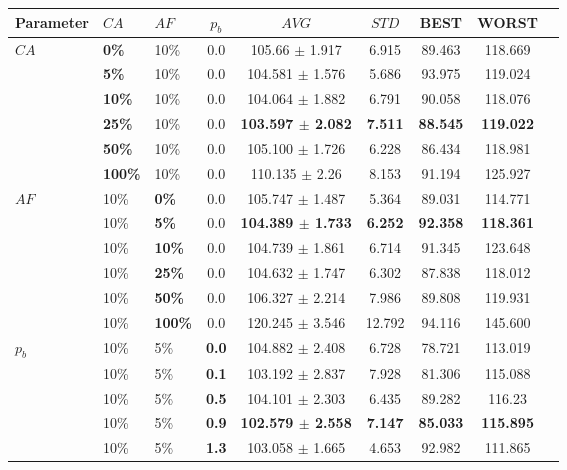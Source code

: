 \begin{table}
    \centering
    \begin{tabular}{|l|l|l|c||c|c|c|c|c|}
    \hline
    Parameter & $CA$ & $AF$ & $p_b$ & $AVG$ & $STD$ &BEST & WORST \\
    \hline
    $CA$ & \textbf{0\%} & 10\% & 0.0 & 105.66 $\pm$ 1.917 & 6.915 & 89.463 & 118.669\\
    ~ & \textbf{5\%} & 10\% & 0.0 & 104.581 $\pm$ 1.576 & 5.686 & 93.975 & 119.024\\
    ~ & \textbf{10\%} & 10\% & 0.0 & 104.064 $\pm$ 1.882 & 6.791 & 90.058 & 118.076\\
    ~ & \textbf{25\%} & 10\% & 0.0 & \textbf{103.597 $\pm$ 2.082} & \textbf{7.511} & \textbf{88.545} & \textbf{119.022}\\
    ~ & \textbf{50\%} & 10\% & 0.0 & 105.100 $\pm$ 1.726 & 6.228 & 86.434 & 118.981\\
    ~ & \textbf{100\%} & 10\% & 0.0 & 110.135 $\pm$ 2.26 & 8.153 & 91.194 & 125.927\\
    \hline
    $AF$ & 10\% & \textbf{0\%} & 0.0 & 105.747 $\pm$ 1.487 & 5.364& 89.031 & 114.771\\
    ~ & 10\% & \textbf{5\%} & 0.0 & \textbf{104.389 $\pm$ 1.733} & \textbf{6.252}& \textbf{92.358} & \textbf{118.361}\\
    ~ & 10\% & \textbf{10\%} & 0.0 & 104.739 $\pm$ 1.861 & 6.714 & 91.345 & 123.648\\
    ~ & 10\% & \textbf{25\%} & 0.0 & 104.632 $\pm$ 1.747 & 6.302 & 87.838 & 118.012\\
    ~ & 10\% & \textbf{50\%} & 0.0 & 106.327 $\pm$ 2.214 & 7.986 & 89.808 & 119.931\\
    ~ & 10\% & \textbf{100\%} & 0.0 & 120.245 $\pm$ 3.546 & 12.792 & 94.116 & 145.600\\
    \hline
    $p_b$ & 10\% & 5\% & \textbf{0.0} & 104.882 $\pm$ 2.408 & 6.728 & 78.721 & 113.019\\
    ~ & 10\% & 5\% & \textbf{0.1} & 103.192 $\pm$ 2.837 & 7.928 & 81.306 & 115.088\\
    ~ & 10\% & 5\% & \textbf{0.5} & 104.101 $\pm$ 2.303 & 6.435 &89.282 & 116.23\\
    ~ & 10\% & 5\% & \textbf{0.9} & \textbf{102.579 $\pm$ 2.558} & \textbf{7.147} & \textbf{85.033} & \textbf{115.895}\\
    ~ & 10\% & 5\% & \textbf{1.3} & 103.058 $\pm$ 1.665 & 4.653 & 92.982 & 111.865\\

\end{tabular}
\end{table}
